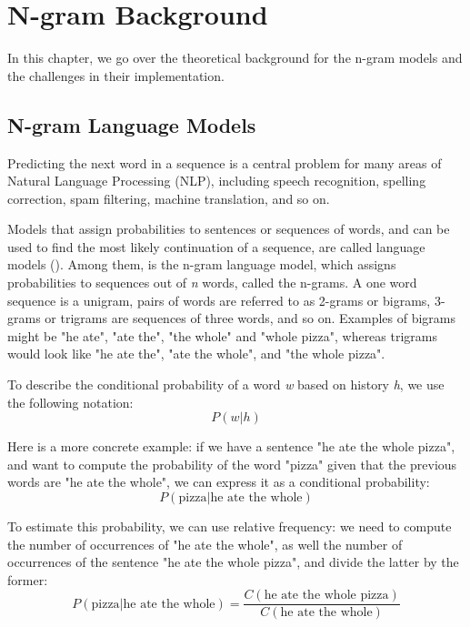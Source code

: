 \chapter{N-gram Background}
\label{chap:NgramBackground}

In this chapter, we go over the theoretical background for the n-gram models and the challenges in their implementation.

\section{N-gram Language Models}
\label{sec:NgramBackground-LanguageModels}
Predicting the next word in a sequence is a central problem for many areas of Natural Language Processing (NLP), including speech recognition, spelling correction, spam filtering, machine translation, and so on.

Models that assign probabilities to sentences or sequences of words, and can be used to find the most likely continuation of a sequence, are called language models (\cite{Jura09a}). Among them, is the n-gram language model, which assigns probabilities to sequences out of \textit{n} words, called the n-grams. A one word sequence is a unigram, pairs of words are referred to as 2-grams or bigrams, 3-grams or trigrams are sequences of three words, and so on. Examples of bigrams might be "he ate", "ate the", "the whole" and "whole pizza", whereas trigrams would look like "he ate the", "ate the whole", and "the whole pizza".

To describe the conditional probability of a word \textit{w} based on history \textit{h}, we use the following notation:
\begin{equation}
    P(w|h)
\end{equation}

Here is a more concrete example: if we have a sentence "he ate the whole pizza", and want to compute the probability of the word "pizza" given that the previous words are "he ate the whole", we can express it as a conditional probability:
\begin{equation}
    P(\text{pizza}|\text{he ate the whole})
\end{equation}

To estimate this probability, we can use relative frequency: we need to compute the number of occurrences of "he ate the whole", as well the number of occurrences of the sentence "he ate the whole pizza", and divide the latter by the former:
\begin{equation}
    P(\text{pizza}|\text{he ate the whole})=\frac{C(\text{he ate the whole pizza})}{C(\text{he ate the whole})}
\end{equation}


